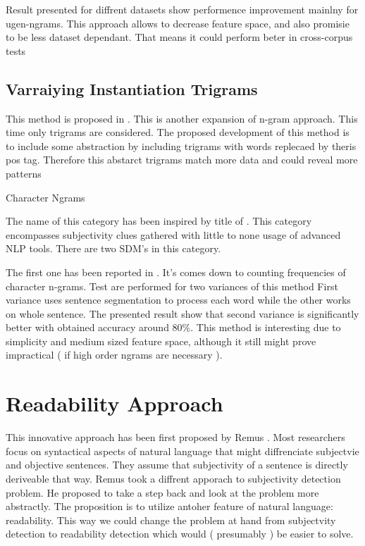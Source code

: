 Result presented for diffrent datasets show performence improvement mainlny for ugen-ngrams. This approach allows to decrease feature space, and also
promisie to be less dataset dependant. That means it could perform  beter in cross-corpus tests

\subsection{ Varraiying Instantiation Trigrams }

This method is proposed in \cite{Muray2011}. This is another expansion of n-gram approach. This time only trigrams are considered. The proposed development 
of this method is to include some abstraction by including trigrams with words replecaed by theris pos tag. Therefore this abstarct trigrams 
match more data and could reveal more patterns

Character Ngrams

The name of this category has been inspired by title of \cite{kraaij2008}. This category encompasses subjectivity clues gathered with little to none usage
of advanced NLP tools. There are two SDM's in this category. 

The first one has been reported in \cite{kraaij2008}. It's comes down to counting frequencies of character n-grams. Test are performed for two variances of this method
First variance uses sentence segmentation to process each word while the other works on whole sentence. The presented result show that second variance is 
significantly better with obtained accuracy around 80\%. This method is interesting due to simplicity and medium sized feature space, although it still might
prove impractical ( if high order ngrams are necessary ).

\section{ Readability Approach }

This innovative approach has been first proposed by Remus \cite{remus2011}. Most researchers focus on syntactical
aspects of natural language that might diffrenciate subjectvie and objective sentences. They assume that subjectivity of a sentence is directly 
deriveable that way. Remus took a diffrent apporach to subjectivity detection problem. He proposed to take a step back and look at the problem
more abstractly. The proposition is to utilize antoher feature of natural language: readability. This way we could change the problem at hand
from subjectvity detection to readability detection which would ( presumably ) be easier to solve.

